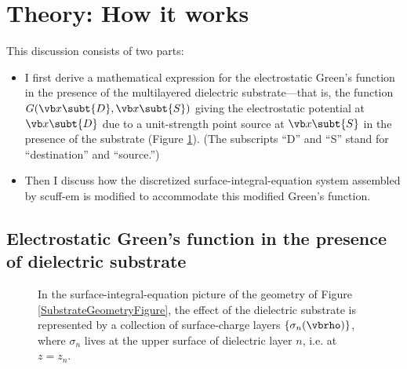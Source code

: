 \documentclass[letterpaper]{article}
\begin{document}
\newpage
\section{Theory: How it works}
\label{TheorySection}
This discussion consists of two parts:
\begin{itemize}
 \item
 I first derive a mathematical expression for the electrostatic
 Green's function in the presence of the multilayered dielectric
 substrate---that is, the function $G(\vb x\subt{D},\vb x\subt{S})$
 giving the electrostatic potential at $\vb x\subt{D}$ due to a
 unit-strength point source at $\vb x\subt{S}$ in the 
 presence of the substrate (Figure \ref{SigmaLayersFigure}).
 (The subscripts ``D'' and ``S'' stand for ``destination'' and ``source.'')

 \item
 Then I discuss how the discretized surface-integral-equation
 system assembled by {\sc scuff-em} is modified to accommodate
 this modified Green's function.
\end{itemize}

\subsection{Electrostatic Green's function in the presence of
            dielectric substrate}
\begin{figure}
\begin{center}
\caption{In the surface-integral-equation picture of the geometry of Figure
         \ref{SubstrateGeometryFigure}, the effect of the dielectric substrate
         is represented by a collection of surface-charge layers
         $\{\sigma_{n}(\vbrho)\}$, where $\sigma_n$ lives at the 
         upper surface of dielectric layer $n$, i.e. at $z=z_n$.}
\label{SigmaLayersFigure}
\end{center}
\end{figure}
\end{document}
